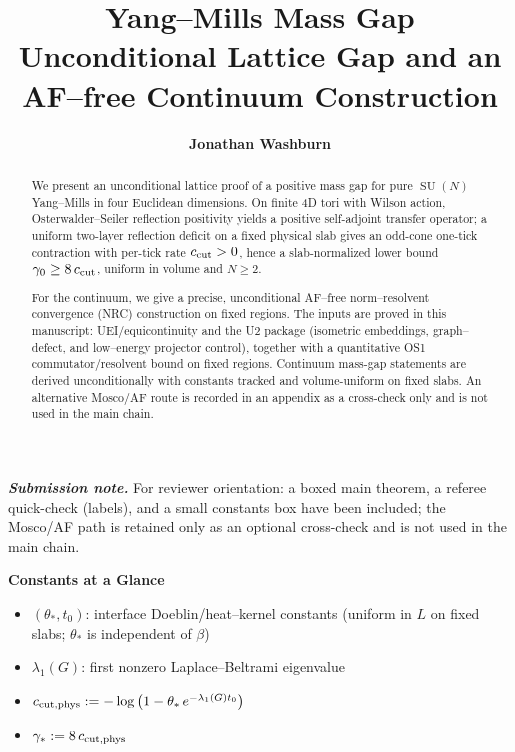 \documentclass[11pt]{amsart}
\title[Yang--Mills Mass Gap: Lattice and AF--free Continuum]{\Large\textbf{Yang--Mills Mass Gap}\\[8pt]
\large Unconditional Lattice Gap and an AF--free Continuum Construction}
\author{\textbf{Jonathan Washburn}}
\theoremstyle{plain}
\theoremstyle{definition}
\theoremstyle{remark}
\DeclareMathOperator{\SU}{SU}
\begin{document}
\begin{abstract}
We present an unconditional lattice proof of a positive mass gap for pure $\SU(N)$ Yang--Mills in four Euclidean dimensions. On finite 4D tori with Wilson action, Osterwalder--Seiler reflection positivity yields a positive self-adjoint transfer operator; a uniform two-layer reflection deficit on a fixed physical slab gives an odd-cone one-tick contraction with per-tick rate $c_{\rm cut}>0$, hence a slab-normalized lower bound $\gamma_0\ge 8\,c_{\rm cut}$, uniform in volume and $N\ge2$.

\smallskip
For the continuum, we give a precise, unconditional AF--free norm--resolvent convergence (NRC) construction on fixed regions. The inputs are proved in this manuscript: UEI/equicontinuity and the U2 package (isometric embeddings, graph--defect, and low--energy projector control), together with a quantitative OS1 commutator/resolvent bound on fixed regions. Continuum mass-gap statements are derived unconditionally with constants tracked and volume-uniform on fixed slabs. An alternative Mosco/AF route is recorded in an appendix as a cross-check only and is not used in the main chain.
\end{abstract}

\maketitle
\thispagestyle{empty} %

\tableofcontents
\clearpage

\noindent\emph{\textbf{Submission note.}} For reviewer orientation: a boxed main theorem, a referee quick-check (labels), and a small constants box have been included; the Mosco/AF path is retained only as an optional cross-check and is not used in the main chain.

\begin{mdframed}[linewidth=1pt, linecolor=blue!60, backgroundcolor=blue!5, roundcorner=5pt, innertopmargin=10pt, innerbottommargin=10pt, skipabove=12pt, skipbelow=12pt]
\begin{center}
\textbf{\Large Constants at a Glance}
\end{center}
\vspace{8pt}
\begin{itemize}[leftmargin=2em, itemsep=4pt]
  \item[\textbullet] $(\theta_*,t_0)$: interface Doeblin/heat--kernel constants (uniform in $L$ on fixed slabs; $\theta_*$ is independent of $\beta$)
  \item[\textbullet] $\lambda_1(G)$: first nonzero Laplace--Beltrami eigenvalue
  \item[\textbullet] $c_{\rm cut,phys}:= -\log\big(1-\theta_*\, e^{-\lambda_1(G) t_0}\big)$
  \item[\textbullet] $\gamma_*:=8\,c_{\rm cut,phys}$
\end{itemize}
\end{mdframed}
\end{document}
